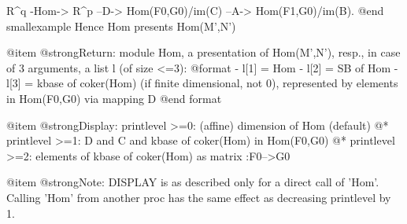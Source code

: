  R^q -Hom-> R^p --D-> Hom(F0,G0)/im(C) --A-> Hom(F1,G0)/im(B).
@end smallexample
Hence Hom presents Hom(M',N')

@item @strong{Return:}
module Hom, a presentation of Hom(M',N'), resp., in case of
3 arguments, a list l (of size <=3):
@format
           - l[1] = Hom
           - l[2] = SB of Hom
           - l[3] = kbase of coker(Hom) (if finite dimensional, not 0),
                    represented by elements in Hom(F0,G0) via mapping D
@end format

@item @strong{Display:}
printlevel >=0: (affine) dimension of Hom (default)
@* printlevel >=1: D and C and kbase of coker(Hom) in Hom(F0,G0)
@* printlevel >=2: elements of kbase of coker(Hom) as matrix :F0-->G0

@item @strong{Note:}
DISPLAY is as described only for a direct call of 'Hom'. Calling 'Hom'
from another proc has the same effect as decreasing printlevel by 1.

